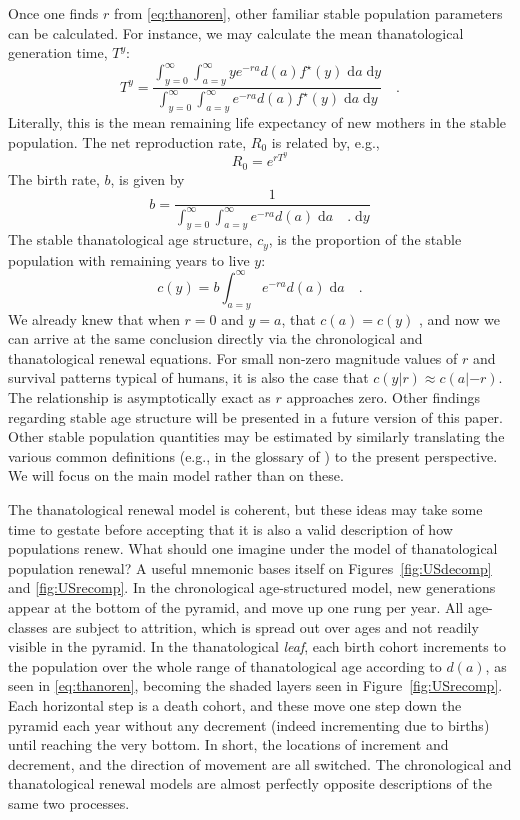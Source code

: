 \documentclass{article}
\newcommand{\dd}{\; \mathrm{d}}
\begin{document}
Once one finds $r$ from \eqref{eq:thanoren}, other familiar stable population
parameters can be calculated. For instance, we may calculate the mean
thanatological generation time, $T^y$:
\begin{equation}
\label{eq:Ty}
 T^y =  \frac{\int _{y=0}^\infty \int _{a=y}^\infty y e^{-ra} d(a) f^\star(y) \dd a
\dd y}{\int _{y=0}^\infty \int _{a=y}^\infty e^{-ra} d(a) f^\star(y) \dd a \dd
y} \quad \text{.}
\end{equation}
Literally, this is the mean remaining life expectancy of new mothers in the
stable population. The net reproduction rate, $R_0$ is related by, e.g.,
\begin{equation}
\label{eq:R0fromTy}
R_0 = e^{r T^y}
\end{equation}
The birth rate, $b$, is given by
\begin{equation}
\label{eq:eybrate}
b = \frac{1}{\int _{y=0}^\infty \int _{a=y}^\infty e^{-ra} d(a) \dd a
\quad\text{.} \dd y}
\end{equation}
The stable thanatological age structure, $c_y$, is the
proportion of the stable population with remaining years to live $y$:
\begin{equation}
\label{eq:cy}
c(y) = b \int _{a=y}^\infty e^{-ra} d(a) \dd a \quad\text{.}
\end{equation}
We already knew that when $r = 0$ and $y = a$, that $c(a)=c(y)$
\citep{vaupel2009life}, and now we can arrive at the same conclusion directly
via the chronological and thanatological renewal equations. For small non-zero
magnitude values of $r$ and survival patterns typical of humans, it is also the
case that $c(y|r)\approx c(a|-r)$. The relationship is asymptotically exact as
$r$ approaches zero. Other findings regarding stable age structure will be
presented in a future version of this paper. Other stable population quantities
may be estimated by similarly translating the various common definitions (e.g.,
in the glossary of \citet{coale1972growth}) to the present perspective. We will
focus on the main model rather than on these.

The thanatological renewal model is coherent, but these ideas may take some time
to gestate before accepting that it is also a valid description of how
populations renew. What should one imagine under the model of thanatological
population renewal? A useful mnemonic bases itself on Figures~\ref{fig:USdecomp}
and \ref{fig:USrecomp}. In the chronological age-structured model, new
generations appear at the bottom of the pyramid, and move up one rung per year.
All age-classes are subject to attrition, which is spread out over ages and not
readily visible in the pyramid. In the thanatological \textit{leaf}, each birth cohort increments to the population over the whole range of thanatological age
according to $d(a)$, as seen in \eqref{eq:thanoren}, becoming the
shaded layers seen in Figure~\ref{fig:USrecomp}. Each horizontal step is a death
cohort, and these move one step down the pyramid each year without any decrement
(indeed incrementing due to births) until reaching the very bottom. In short,
the locations of increment and decrement, and the direction of movement are all
switched. The chronological and thanatological renewal models are almost
perfectly opposite descriptions of the same two processes.
\end{document}
